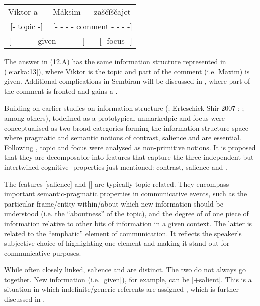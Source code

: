 \documentclass[output=paper
,modfonts
,nonflat]{langsci/langscibook}
\begin{document}
\begin{exe}
	\ex\label{e:arka:13}
		\begin{tabular}[t]{lll}
			Víktor-a & Máksim & zaščǐščajet\\
			\multicolumn{1}{c}{[- topic -]} & \multicolumn{2}{r}{[- - - - comment - - - -]}\\
			\multicolumn{2}{c}{[- - - - - given - - - - -]} & \multicolumn{1}{r}{[- focus -]}\\
		\end{tabular}
\end{exe}

\noindent
The answer in (\hyperref[e:arka:12a]{12.A}) has the same information structure represented in (\ref{e:arka:13}), where Viktor is the topic and part of the comment (i.e. Maxim) is given. Additional complications in  Sembiran will be discussed in , where part of the comment is fronted and gains a . 

Building on earlier studies on information structure (\citealt{Vallduví1996}; 
Erte\-schick-Shir 2007 \citeyear{Erteschick-Shir2007};  
\citealt{Dalrymple2011,Krifka2012}; among others), todefined as a prototypical unmarkedpic and focus were conceptualised as two broad categories forming the information structure space where pragmatic and semantic notions of contrast, salience and  are essential. Following \citet[133]{Choi1999}, topic and focus were analysed as non-primitive notions. It is proposed that they are decomposable into features that capture the three independent but intertwined cognitive- properties just mentioned: contrast, salience and .

The features [salience] and [] are typically topic-related. They encompass important semantic-pragmatic properties in communicative events, such as the particular frame/entity within/about which new information should be understood (i.e. the “aboutness” of the topic), and the degree of  of one piece of information relative to other bits of information in a given context. The latter is related to the “emphatic” element of communication. It reflects the speaker’s subjective choice of highlighting one element and making it stand out for communicative purposes.

While often closely linked, salience and  are distinct. The two do not always go together. New information (i.e. [\textminus given]), for example, can be [+salient]. This is a situation in which indefinite/generic referents are assigned , which is further discussed in .
\end{document}

